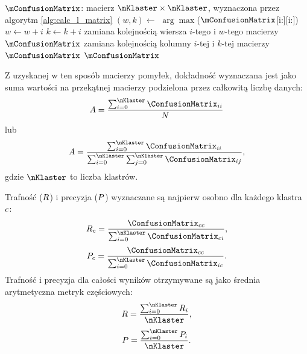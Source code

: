 \documentclass[a4paper,twoside,12pt]{book}
\begin{document}
\begin{algorithm}[t]
	\caption{Permutacja macierzy $\mConfusionMatrix$}
	\label{alg:perm_l_matrix}
	\begin{algorithmic}[1]
		\Require $\mConfusionMatrix$: macierz $\nKlaster \times \nKlaster$, wyznaczona przez algorytm \ref{alg:calc_l_matrix}
		\State $(w, k) \gets$ $\arg\max$($\mConfusionMatrix$[i:][i:]) 
		\State $w \gets w + i$
		\State $k \gets k + i$
		\State zamiana kolejnością wiersza $i$-tego i $w$-tego macierzy $\mConfusionMatrix$
		\State zamiana kolejnością kolumny $i$-tej i $k$-tej macierzy $\mConfusionMatrix$
		\EndFor
		\State \Return $\mConfusionMatrix$
		\EndProcedure
	\end{algorithmic}
\end{algorithm}

Z uzyskanej w ten sposób macierzy pomyłek, dokładność wyznaczana jest jako suma wartości na przekątnej macierzy podzielona przez całkowitą liczbę danych:
\begin{align}
\accuracy = \frac{\sum_{i=0}^{\nKlaster}\ConfusionMatrix_{ii}}{N}
\end{align}
lub
\begin{align}
\accuracy = \frac{\sum_{i=0}^{\nKlaster}\ConfusionMatrix_{ii}}{\sum_{i=0}^{\nKlaster}\sum_{j=0}^{\nKlaster}\ConfusionMatrix_{ij}},
\end{align}
gdzie $\nKlaster$ to liczba klastrów.

Trafność ($R$) i precyzja ($P$) wyznaczane są najpierw osobno dla każdego klastra $c$:
%
\begin{align}
	\recall_{\klaster} = \frac{\ConfusionMatrix_{\klaster\klaster}}{\sum_{i=0}^{\nKlaster}\ConfusionMatrix_{\klaster i}},
	\label{eq:recall}
\end{align}
%
\begin{align}
	\precision_{\klaster} = \frac{\ConfusionMatrix_{\klaster\klaster}}{\sum_{i=0}^{\nKlaster}\ConfusionMatrix_{i \klaster}}.
	\label{eq:precision}
\end{align}
%
Trafność i precyzja dla całości wyników otrzymywane są jako średnia arytmetyczna metryk częściowych:
\begin{align}
	\recall = \frac{\sum_{i=0}^{\nKlaster}\recall_{i}}{\nKlaster},
\end{align}
\begin{align}
	\precision = \frac{\sum_{i=0}^{\nKlaster}\precision_{i}}{\nKlaster}.
\end{align}
%
\end{document}
